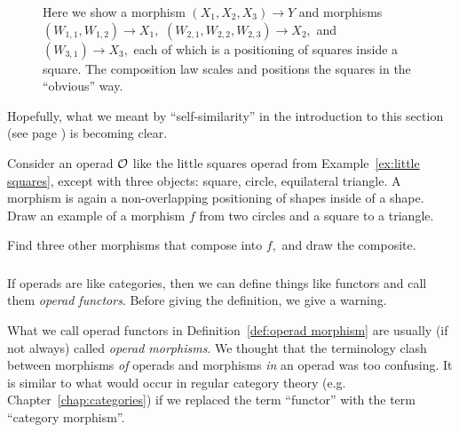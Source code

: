 \documentclass[CT4S-EN-RU]{subfiles}
\begin{document}
\begin{exampleENG}
\begin{figure}[H]
\begin{center}
\end{center}
\caption{Here we show a morphism $(X_1,X_2,X_3)\to Y$ and morphisms $(W_{1,1},W_{1,2})\to X_1,$ $(W_{2,1},W_{2,2},W_{2,3})\to X_2,$ and $(W_{3,1})\to X_3,$ each of which is a positioning of squares inside a square. The composition law scales and positions the squares in the “obvious” way.}
\label{fig:composition law for squares}
\end{figure}

Hopefully, what we meant by “self-similarity” in the introduction to this section (see page \pageref{sec:operad}) is becoming clear.
\end{exampleENG}

\begin{exampleRUS}\label{ex:little squares}
\end{exampleRUS}

\begin{exerciseENG}\label{exc:little shapes}
Consider an operad $\mathcal{O}$ like the little squares operad from Example~\ref{ex:little squares}, except with three objects: square, circle, equilateral triangle. A morphism is again a non-overlapping positioning of shapes inside of a shape. 
\sexc Draw an example of a morphism $f$ from two circles and a square to a triangle.
\item Find three other morphisms that compose into $f,$ and draw the composite.
\endsexc
\end{exerciseENG}

\begin{exerciseRUS}\label{exc:little shapes}
\end{exerciseRUS}


\subsubsection{}

\begin{blockENG}
If operads are like categories, then we can define things like functors and call them {\em operad functors}. Before giving the definition, we give a warning.
\end{blockENG}

\begin{blockRUS}
\end{blockRUS}

\begin{warningENG}
What we call operad functors in Definition~\ref{def:operad morphism} are usually (if not always) called {\em operad morphisms}. We thought that the terminology clash between morphisms {\em of} operads and morphisms {\em in} an operad was too confusing. It is similar to what would occur in regular category theory (e.g. Chapter~\ref{chap:categories}) if we replaced the term “functor” with the term “category morphism”. 
\end{warningENG}
\end{document}
